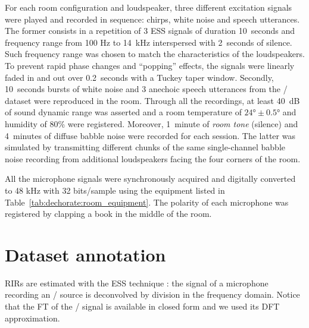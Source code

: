 \mynewline
For each room configuration and loudspeaker, three different excitation signals were played and recorded in sequence: chirps, white noise and speech utterances.
The former consists in a repetition of 3 \acf{ESS} signals of duration 10~seconds and frequency range from 100 Hz to 14~kHz interspersed with 2~seconds of silence.
Such frequency range was chosen to match the characteristics of the loudspeakers.
To prevent rapid phase changes and ``popping'' effects, the signals were linearly faded in and out over 0.2~seconds with a Tuckey taper window.
Secondly, 10~seconds bursts of white noise and 3 anechoic speech utterances from the \WSJ/ dataset  were reproduced in the room.
Through all the recordings, at least 40~dB of sound dynamic range was asserted and a room temperature of $\ang{24} \pm \ang{0.5}$ and humidity of 80\% were registered.
Moreover, 1~minute of \textit{room tone} (silence) and 4~minutes of diffuse babble noise were recorded for each session.
The latter was simulated by transmitting different chunks of the same single-channel babble noise recording from additional loudspeakers facing the four corners of the room.

\mynewline
All the microphone signals were synchronously acquired and digitally converted to 48 kHz with 32 bits/sample using the equipment listed in Table~\ref{tab:dechorate:room_equipment}. The polarity of each microphone was registered by clapping a book in the middle of the room.

\section{Dataset annotation}\label{sec:annotation}
\acp{RIR} are estimated with the ESS technique :
the signal of a microphone recording an \ESS/ source is deconvolved by division in the frequency domain.
Notice that the \ac{FT} of the \ESS/ signal is available in closed form and we used its \ac{DFT} approximation.


